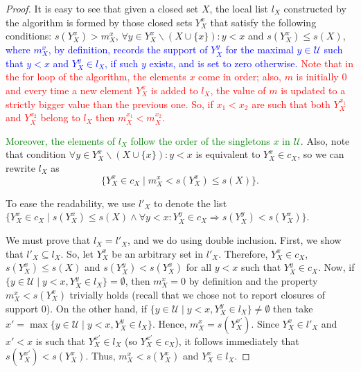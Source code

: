 \documentclass{article}
\newcommand{\added}[1]{\textcolor{blue}{#1}}
\def\U{\mathcal{U}}
\def\s{\mathit{s}}
\begin{document}
\begin{proof} %
It is easy to see that given a closed set $X$, the local list $l_X$ constructed by the algorithm is formed by those closed sets $Y^x_X$ that satisfy the following conditions: $\s(Y^x_X)>m^x_X$, $ \forall y \in Y^x_X\backslash (X \cup \{x\}): y<x$ and $\s(Y^x_X) \leq \s(X)$,
\added{where $m^x_X$, by definition, records the  support of $Y^y_X$ for the maximal $y \in \U$ such that $y<x$ and $Y^y_X \in l_X$, if such $y$ exists, and is set to zero otherwise.}
%												
%												
\textcolor{red}{Note that in the for loop of the algorithm, the elements $x$ come in order; also, $m$ is initially 0 and every time a new element $Y^x_X$ is added to $l_X$, the value of $m$ is updated to a strictly bigger value than the previous one. So, if $x_1<x_2$ are such that both $Y^{x_1}_X$ and $Y^{x_2}_X$ belong to $l_X$ then $m^{x_1}_X<m^{x_2}_X$.}



\textcolor{green}{Moreover, the elements of $l_X$ follow the order of the singletons $x$ in $\U$}. Also, note that condition $\forall y \in Y^x_X\backslash (X \cup \{x\}): y<x$ is equivalent to $Y^x_X \in c_X$, so we can rewrite $l_X$ as $$\{Y^x_X \in c_X\mid  m^x_X < \s(Y^x_X) \leq \s(X)\}.$$

To ease the readability, we use $l'_X$ to denote the list 
$\{Y^x_X \in c_X\mid \s(Y^x_X) \leq \s(X) \wedge \forall y<x: Y^y_X \in c_X \Rightarrow \s(Y^y_X) < \s(Y^x_X)\}.$



We must prove that $l_X=l'_X$, and we do using double inclusion.
First, we show that $l'_X \subseteq l_X$. So, let $Y^x_X$ be an arbitrary set in $l'_X$. Therefore, $Y^x_X \in c_X$, $\s(Y^x_X) \leq \s(X)$ and $\s(Y^y_X)<\s(Y^x_X)$ for all $y<x$ such that $Y^y_X \in c_X$. Now, if $\{ y \in \U \mid y<x, Y^y_X \in l_X\}=\emptyset$, then $m^x_X=0$ by definition and the property $m^x_X < \s(Y^x_X)$ trivially holds (recall that we chose not to report closures of support 0).
On the other hand, if $\{y\in \U \mid y<x, Y^y_X \in l_X\} \neq \emptyset$ then take $x'=\max\{y \in \U \mid y<x,Y^y_X \in l_X\}$. Hence, $m^x_X=\s(Y^{x'}_X)$. Since $Y^x_X \in l'_X$ and $x'<x$ is such that $Y^{x'}_X \in l_X$ (so $Y^{x'}_X \in c_X$), it follows immediately that $\s(Y^{x'}_X)<\s(Y^x_X)$. Thus, $m^x_X<\s(Y^x_X)$ and $Y^x_X \in l_X$.




\end{proof}
\end{document}
